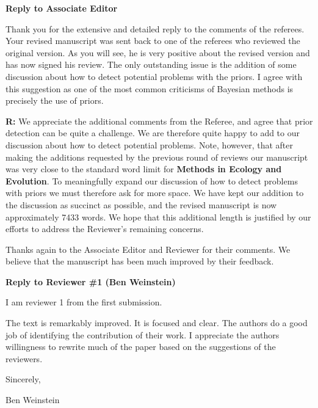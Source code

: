\documentclass[12pt]{letter}
\newenvironment{refquote}{\bigskip \begin{it}}{\end{it}\smallskip}
\begin{document}
\newpage

\setcounter{page}{1}


{\Large \bf Reply to Associate Editor}


	\begin{refquote}
		
		Thank you for the extensive and detailed reply to the comments of the referees. Your revised manuscript was sent back to one of the referees who reviewed the original version. As you will see, he is very positive about the revised version and has now signed his review. The only outstanding issue is the addition of some discussion about how to detect potential problems with the priors. I agree with this suggestion as one of the most common criticisms of Bayesian methods is precisely the use of priors.

	\end{refquote}


	\textbf{R:} We appreciate the additional comments from the Referee, and agree that prior detection can be quite a challenge. We are therefore quite happy to add to our discussion about how to detect potential problems. Note, however, that after making the additions requested by the previous round of reviews our manuscript was very close to the standard word limit for \textbf{Methods in Ecology and Evolution}. To meaningfully expand our discussion of how to detect problems with priors we must therefore ask for more space. We have kept our addition to the discussion as succinct as possible, and the revised manuscript is now approximately 7433 words. We hope that this additional length is justified by our efforts to address the Reviewer's remaining concerns.


	Thanks again to the Associate Editor and Reviewer for their comments. We believe that the manuscript has been much improved by their feedback.


\newpage


{\Large \bf Reply to Reviewer \#1 (Ben Weinstein)}

	\begin{refquote}

		I am reviewer 1 from the first submission. 

		The text is remarkably improved. It is focused and clear. The authors do a good job of identifying the contribution of their work. I appreciate the authors willingness to rewrite much of the paper based on the suggestions of the reviewers. 


		Sincerely, 

		Ben Weinstein

	\end{refquote}
\end{document}
